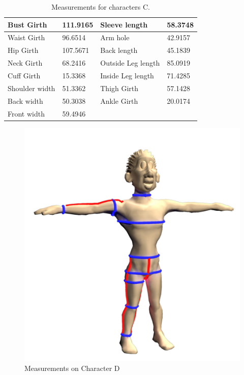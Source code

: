 \begin{table}[H]
    \centering
    \begin{tabular}{|p{3.4cm}|p{1.8cm}|p{3.4cm}|p{1.8cm}|}
        \hline
        Bust Girth & 111.9165 & Sleeve length & 58.3748\\
        \hline
        Waist Girth & 96.6514 & Arm hole & 42.9157\\
        \hline
        Hip Girth & 107.5671 & Back length & 45.1839\\
        \hline
        Neck Girth &68.2416 & Outside Leg length & 85.0919\\
        \hline
        Cuff Girth &15.3368 & Inside Leg length & 71.4285\\
        \hline
        Shoulder width &51.3362 & Thigh Girth & 57.1428\\
        \hline
        Back width &50.3038 & Ankle  Girth & 20.0174\\
        \hline
        Front width &59.4946 &  &  \\
        \hline        
    \end{tabular}
    \caption{Measurements for characters C.} %
    \label{table:measurements_result_C}
\end{table}

\begin{figure}[H]
\includegraphics[width=\textwidth]{../images/geodesic_image/D_measurement}
\caption{Measurements on Character D}
\label{figure:D_all_measurement} 
\end{figure}

